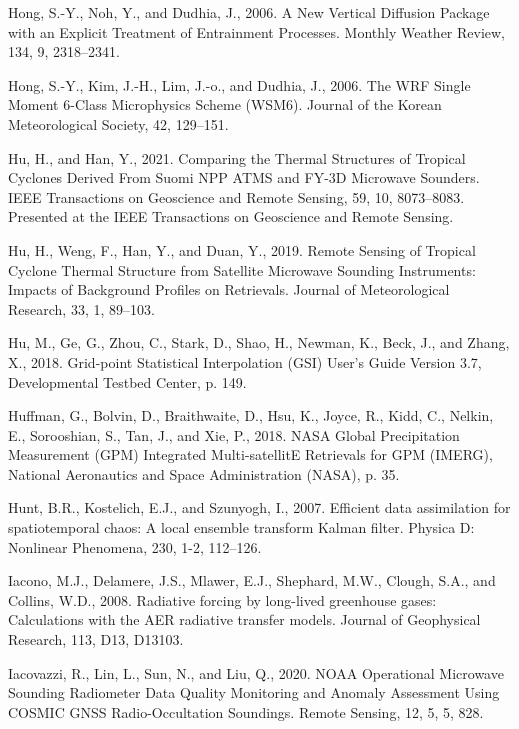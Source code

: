 \documentclass[12pt,oneside,a4paper]{reedthesis}
\begin{document}
\leavevmode\hypertarget{ref-hong2006}{}%
Hong, S.-Y., Noh, Y., and Dudhia, J., 2006. A New Vertical Diffusion Package with an Explicit Treatment of Entrainment Processes. Monthly Weather Review, 134, 9, 2318--2341.

\leavevmode\hypertarget{ref-hong2006a}{}%
Hong, S.-Y., Kim, J.-H., Lim, J.-o., and Dudhia, J., 2006. The WRF Single Moment 6-Class Microphysics Scheme (WSM6). Journal of the Korean Meteorological Society, 42, 129--151.

\leavevmode\hypertarget{ref-hu2021}{}%
Hu, H., and Han, Y., 2021. Comparing the Thermal Structures of Tropical Cyclones Derived From Suomi NPP ATMS and FY-3D Microwave Sounders. IEEE Transactions on Geoscience and Remote Sensing, 59, 10, 8073--8083. Presented at the IEEE Transactions on Geoscience and Remote Sensing.

\leavevmode\hypertarget{ref-hu2019}{}%
Hu, H., Weng, F., Han, Y., and Duan, Y., 2019. Remote Sensing of Tropical Cyclone Thermal Structure from Satellite Microwave Sounding Instruments: Impacts of Background Profiles on Retrievals. Journal of Meteorological Research, 33, 1, 89--103.

\leavevmode\hypertarget{ref-hu2018}{}%
Hu, M., Ge, G., Zhou, C., Stark, D., Shao, H., Newman, K., Beck, J., and Zhang, X., 2018. Grid-point Statistical Interpolation (GSI) User's Guide Version 3.7, Developmental Testbed Center, p. 149.

\leavevmode\hypertarget{ref-huffman2018}{}%
Huffman, G., Bolvin, D., Braithwaite, D., Hsu, K., Joyce, R., Kidd, C., Nelkin, E., Sorooshian, S., Tan, J., and Xie, P., 2018. NASA Global Precipitation Measurement (GPM) Integrated Multi-satellitE Retrievals for GPM (IMERG), National Aeronautics and Space Administration (NASA), p. 35.

\leavevmode\hypertarget{ref-hunt2007}{}%
Hunt, B.R., Kostelich, E.J., and Szunyogh, I., 2007. Efficient data assimilation for spatiotemporal chaos: A local ensemble transform Kalman filter. Physica D: Nonlinear Phenomena, 230, 1-2, 112--126.

\leavevmode\hypertarget{ref-iacono2008}{}%
Iacono, M.J., Delamere, J.S., Mlawer, E.J., Shephard, M.W., Clough, S.A., and Collins, W.D., 2008. Radiative forcing by long-lived greenhouse gases: Calculations with the AER radiative transfer models. Journal of Geophysical Research, 113, D13, D13103.

\leavevmode\hypertarget{ref-iacovazzi2020}{}%
Iacovazzi, R., Lin, L., Sun, N., and Liu, Q., 2020. NOAA Operational Microwave Sounding Radiometer Data Quality Monitoring and Anomaly Assessment Using COSMIC GNSS Radio-Occultation Soundings. Remote Sensing, 12, 5, 5, 828.
\end{document}

